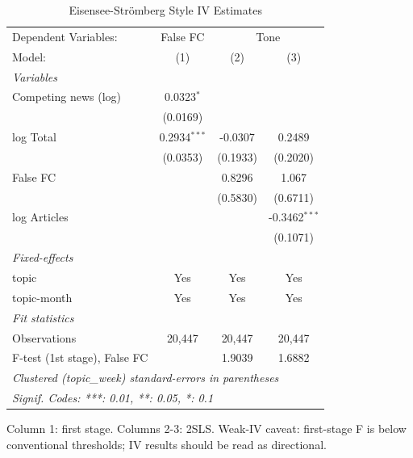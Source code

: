 
\begin{table}[htbp]
   \caption{\label{tab:iv} Eisensee-Str{\"o}mberg Style IV Estimates}
   \centering
   \begin{tabular}{lccc}
      \tabularnewline \midrule \midrule
      Dependent Variables: & False FC & \multicolumn{2}{c}{Tone}\\
      Model:                       & (1)            & (2)      & (3)\\  
      \midrule
      \emph{Variables}\\
      Competing news (log)         & 0.0323$^{*}$   &          &   \\   
                                   & (0.0169)       &          &   \\   
      log Total                    & 0.2934$^{***}$ & -0.0307  & 0.2489\\   
                                   & (0.0353)       & (0.1933) & (0.2020)\\   
      False FC                     &                & 0.8296   & 1.067\\   
                                   &                & (0.5830) & (0.6711)\\   
      log Articles                 &                &          & -0.3462$^{***}$\\   
                                   &                &          & (0.1071)\\   
      \midrule
      \emph{Fixed-effects}\\
      topic                        & Yes            & Yes      & Yes\\  
      topic-month                  & Yes            & Yes      & Yes\\  
      \midrule
      \emph{Fit statistics}\\
      Observations                 & 20,447         & 20,447   & 20,447\\  
      F-test (1st stage), False FC &                & 1.9039   & 1.6882\\  
      \midrule \midrule
      \multicolumn{4}{l}{\emph{Clustered (topic\_week) standard-errors in parentheses}}\\
      \multicolumn{4}{l}{\emph{Signif. Codes: ***: 0.01, **: 0.05, *: 0.1}}\\
   \end{tabular}
   
   \par \raggedright 
   Column 1: first stage. Columns 2-3: 2SLS. Weak-IV caveat: first-stage F is below conventional thresholds; IV results should be read as directional.
\end{table}


